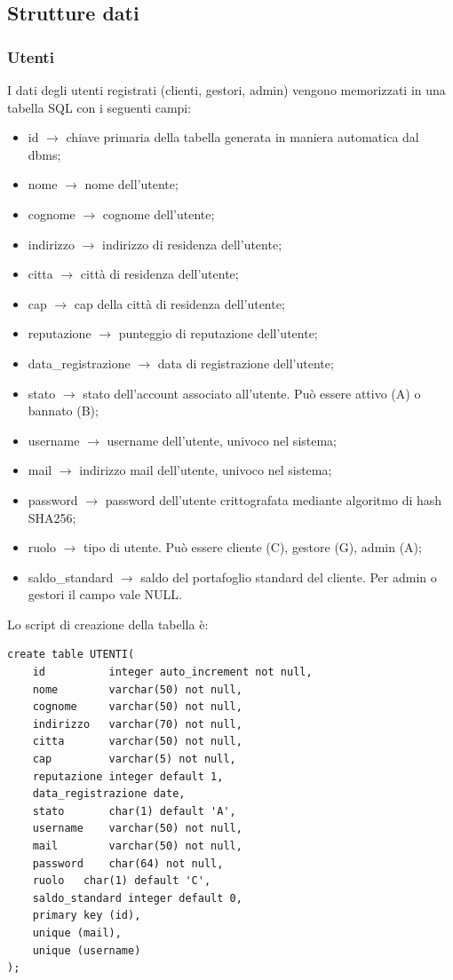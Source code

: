 \documentclass[a4paper, 14pt]{article}
\begin{document}
\begin{flushleft}
		
		\subsection{Strutture dati}
				\subsubsection{Utenti}
				I dati degli utenti registrati (clienti, gestori, admin) vengono memorizzati in una tabella SQL con i seguenti campi:
				\begin{itemize}
					\item id $\rightarrow$ chiave primaria della tabella generata in maniera automatica dal dbms;
					\item nome $\rightarrow$ nome dell'utente;
					\item cognome $\rightarrow$ cognome dell'utente;
					\item indirizzo $\rightarrow$ indirizzo di residenza dell'utente;
					\item citta $\rightarrow$ città di residenza dell'utente;
					\item cap $\rightarrow$ cap della città di residenza dell'utente;
					\item reputazione $\rightarrow$ punteggio di reputazione dell'utente;
					\item data\_registrazione $\rightarrow$ data di registrazione dell'utente;
					\item stato $\rightarrow$ stato dell'account associato all'utente. Può essere attivo (A) o bannato (B);
					\item username $\rightarrow$ username dell'utente, univoco nel sistema;
					\item mail $\rightarrow$ indirizzo mail dell'utente, univoco nel sistema;
					\item password $\rightarrow$ password dell'utente crittografata mediante algoritmo di hash SHA256;
					\item ruolo $\rightarrow$ tipo di utente. Può essere cliente (C), gestore (G), admin (A);
					\item saldo\_standard $\rightarrow$ saldo del portafoglio standard del cliente. Per admin o gestori il campo vale NULL.
				\end{itemize}
				Lo script di creazione della tabella è: \\
				\begin{lstlisting}
create table UTENTI(
	id          integer auto_increment not null,
	nome        varchar(50) not null,
	cognome     varchar(50) not null,
	indirizzo   varchar(70) not null,
	citta       varchar(50) not null,
	cap         varchar(5) not null,
	reputazione integer default 1,
	data_registrazione date,
	stato       char(1) default 'A',
	username    varchar(50) not null,
	mail        varchar(50) not null,
	password    char(64) not null,
	ruolo   char(1) default 'C',
	saldo_standard integer default 0,
	primary key (id),
	unique (mail),
	unique (username)
);
				\end{lstlisting}


\end{flushleft}
\end{document}
